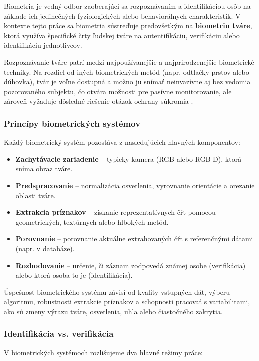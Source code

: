 Biometria je vedný odbor zaoberajúci sa rozpoznávaním a identifikáciou osôb na základe ich jedinečných fyziologických alebo behaviorálnych charakteristík. V kontexte tejto práce sa biometria sústreďuje predovšetkým na \textbf{biometriu tváre}, ktorá využíva špecifické črty ľudskej tváre na autentifikáciu, verifikáciu alebo identifikáciu jednotlivcov.

Rozpoznávanie tváre patrí medzi najpoužívanejšie a najprirodzenejšie biometrické techniky. Na rozdiel od iných biometrických metód (napr. odtlačky prstov alebo dúhovka), tvár je voľne dostupná a možno ju snímať neinvazívne aj bez vedomia pozorovaného subjektu, čo otvára možnosti pre pasívne monitorovanie, ale zároveň vyžaduje dôsledné riešenie otázok ochrany súkromia\cite{inProceedings01} \cite{article03}.

\subsubsection{Princípy biometrických systémov}

Každý biometrický systém pozostáva z nasledujúcich hlavných komponentov:
\begin{itemize}
    \item \textbf{Zachytávacie zariadenie} -- typicky kamera (RGB alebo RGB-D), ktorá sníma obraz tváre.
    \item \textbf{Predspracovanie} -- normalizácia osvetlenia, vyrovnanie orientácie a orezanie oblasti tváre.
    \item \textbf{Extrakcia príznakov} -- získanie reprezentatívnych čŕt pomocou geometrických, textúrnych alebo hlbokých metód.
    \item \textbf{Porovnanie} -- porovnanie aktuálne extrahovaných čŕt s referenčnými dátami (napr. v databáze).
    \item \textbf{Rozhodovanie} -- určenie, či záznam zodpovedá známej osobe (verifikácia) alebo ktorá osoba to je (identifikácia).
\end{itemize}

Úspešnosť biometrického systému závisí od kvality vstupných dát, výberu algoritmu, robustnosti extrakcie príznakov a schopnosti pracovať s variabilitami, ako sú zmeny výrazu tváre, osvetlenia, uhla alebo čiastočného zakrytia.
\subsubsection{Identifikácia vs. verifikácia}

V biometrických systémoch rozlišujeme dva hlavné režimy práce:

